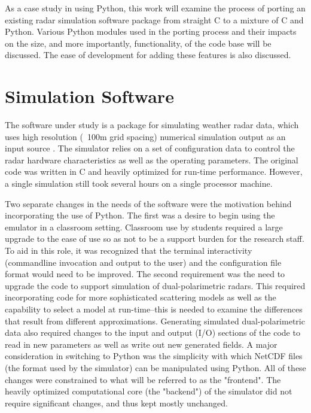 \documentclass[twocolumn]{article}
\begin{document}
As a case study in using Python, this work will examine the process of porting
an existing radar simulation software package from straight C to a mixture of C
and Python. Various Python modules used in the porting process and their impacts
on the size, and more importantly, functionality, of the code base will be
discussed. The ease of development for adding these features is also discussed.

\section{Simulation Software}
The software under study is a package for simulating weather radar data,
which uses high resolution (~100m grid spacing) numerical simulation output as
an input source \cite{radarsim}. The simulator relies on a set of configuration
data to control the radar hardware characteristics as well as the operating
parameters. The original code was written in C and heavily optimized for
run-time performance. However, a single simulation still took several hours on a
single processor machine.

Two separate changes in the needs of the software were the motivation behind
incorporating the use of Python. The first was a desire to begin using the
emulator in a classroom setting. Classroom use by students required a large
upgrade to the ease of use so as not to be a support burden for the research
staff. To aid in this role, it was recognized that the terminal interactivity
(commandline invocation and output to the user) and the configuration file
format would need to be improved. The second requirement was the need to upgrade
the code to support simulation of dual-polarimetric radars. This required
incorporating code for more sophisticated scattering models as well as the
capability to select a model at run-time--this is needed to examine the
differences that result from different approximations. Generating simulated
dual-polarimetric data also required changes to the input and output (I/O)
sections of the code to read in new parameters as well as write out new
generated fields. A major consideration in switching to Python was the
simplicity with which NetCDF files (the format used by the simulator) can be
manipulated using Python. All of these changes were constrained to what will be
referred to as the "frontend". The heavily optimized computational core (the
"backend") of the simulator did not require significant changes, and thus kept 
mostly unchanged.
\end{document}
